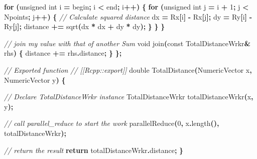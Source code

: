 \documentclass[
  12pt,
  american,
  a4paper,
  extrafontsizes,onecolumn,openright
  ]{memoir}
\newenvironment{Shaded}{\begin{snugshade}}{\end{snugshade}}
\newcommand{\AttributeTok}[1]{\textcolor[rgb]{0.13,0.29,0.53}{#1}}
\newcommand{\CommentTok}[1]{\textcolor[rgb]{0.56,0.35,0.01}{\textit{#1}}}
\newcommand{\ControlFlowTok}[1]{\textcolor[rgb]{0.13,0.29,0.53}{\textbf{#1}}}
\newcommand{\DataTypeTok}[1]{\textcolor[rgb]{0.13,0.29,0.53}{#1}}
\newcommand{\DecValTok}[1]{\textcolor[rgb]{0.00,0.00,0.81}{#1}}
\newcommand{\NormalTok}[1]{#1}
\newcommand{\OperatorTok}[1]{\textcolor[rgb]{0.81,0.36,0.00}{\textbf{#1}}}
\begin{document}
\begin{Shaded}
\begin{Highlighting}[]
    \ControlFlowTok{for} \OperatorTok{(}\DataTypeTok{unsigned} \DataTypeTok{int}\NormalTok{ i }\OperatorTok{=}\NormalTok{ begin}\OperatorTok{;}\NormalTok{ i }\OperatorTok{\textless{}}\NormalTok{ end}\OperatorTok{;}\NormalTok{ i}\OperatorTok{++)} \OperatorTok{\{}
      \ControlFlowTok{for} \OperatorTok{(}\DataTypeTok{unsigned} \DataTypeTok{int}\NormalTok{ j }\OperatorTok{=}\NormalTok{ i }\OperatorTok{+} \DecValTok{1}\OperatorTok{;}\NormalTok{ j }\OperatorTok{\textless{}}\NormalTok{ Npoints}\OperatorTok{;}\NormalTok{ j}\OperatorTok{++)} \OperatorTok{\{}
          \CommentTok{// Calculate squared distance}
\NormalTok{          dx }\OperatorTok{=}\NormalTok{ Rx}\OperatorTok{[}\NormalTok{i}\OperatorTok{]} \OperatorTok{{-}}\NormalTok{ Rx}\OperatorTok{[}\NormalTok{j}\OperatorTok{];}
\NormalTok{          dy }\OperatorTok{=}\NormalTok{ Ry}\OperatorTok{[}\NormalTok{i}\OperatorTok{]} \OperatorTok{{-}}\NormalTok{ Ry}\OperatorTok{[}\NormalTok{j}\OperatorTok{];}
\NormalTok{          distance }\OperatorTok{+=}\NormalTok{ sqrt}\OperatorTok{(}\NormalTok{dx }\OperatorTok{*}\NormalTok{ dx }\OperatorTok{+}\NormalTok{ dy }\OperatorTok{*}\NormalTok{ dy}\OperatorTok{);}
      \OperatorTok{\}}
    \OperatorTok{\}}
  \OperatorTok{\}}

  \CommentTok{// join my value with that of another Sum}
  \DataTypeTok{void}\NormalTok{ join}\OperatorTok{(}\AttributeTok{const}\NormalTok{ TotalDistanceWrkr}\OperatorTok{\&}\NormalTok{ rhs}\OperatorTok{)} \OperatorTok{\{} 
\NormalTok{    distance }\OperatorTok{+=}\NormalTok{ rhs}\OperatorTok{.}\NormalTok{distance}\OperatorTok{;} 
  \OperatorTok{\}}
\OperatorTok{\};}


\CommentTok{// Exported function}
\CommentTok{// [[Rcpp::export]]}
\DataTypeTok{double}\NormalTok{ TotalDistance}\OperatorTok{(}\NormalTok{NumericVector x}\OperatorTok{,}\NormalTok{ NumericVector y}\OperatorTok{)} \OperatorTok{\{}
  
  \CommentTok{// Declare TotalDistanceWrkr instance}
\NormalTok{  TotalDistanceWrkr totalDistanceWrkr}\OperatorTok{(}\NormalTok{x}\OperatorTok{,}\NormalTok{ y}\OperatorTok{);}
  
  \CommentTok{// call parallel\_reduce to start the work}
\NormalTok{  parallelReduce}\OperatorTok{(}\DecValTok{0}\OperatorTok{,}\NormalTok{ x}\OperatorTok{.}\NormalTok{length}\OperatorTok{(),}\NormalTok{ totalDistanceWrkr}\OperatorTok{);}
  
  \CommentTok{// return the result}
  \ControlFlowTok{return}\NormalTok{ totalDistanceWrkr}\OperatorTok{.}\NormalTok{distance}\OperatorTok{;}
\OperatorTok{\}}
\end{Highlighting}
\end{Shaded}
\end{document}
